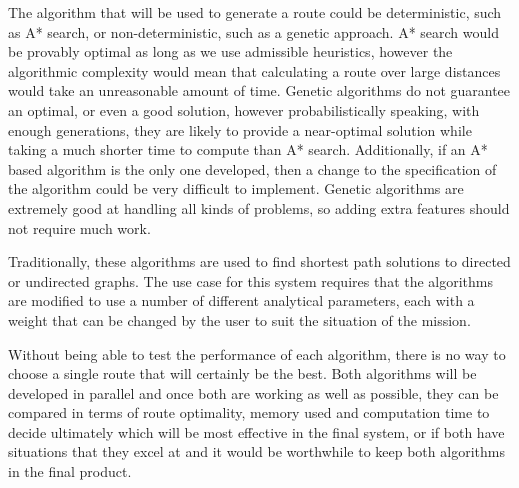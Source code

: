 \documentclass[12pt,a4paper]{article}
\begin{document}
  \par The algorithm that will be used to generate a route could be deterministic, such as A* search, or non-deterministic, such as a genetic approach. A* search would be provably optimal as long as we use admissible heuristics, \cite{hart1968formal} however the algorithmic complexity would mean that calculating a route over large distances would take an unreasonable amount of time. Genetic algorithms do not guarantee an optimal, or even a good solution, however probabilistically speaking, with enough generations, they are likely to provide a near-optimal solution while taking a much shorter time to compute than A* search. Additionally, if an A* based algorithm is the only one developed, then a change to the specification of the algorithm could be very difficult to implement. Genetic algorithms are extremely good at handling all kinds of problems, so adding extra features should not require much work.
  \par Traditionally, these algorithms are used to find shortest path solutions to directed or undirected graphs. The use case for this system requires that the algorithms are modified to use a number of different analytical parameters, each with a weight that can be changed by the user to suit the situation of the mission.
  \par Without being able to test the performance of each algorithm, there is no way to choose a single route that will certainly be the best. Both algorithms will be developed in parallel and once both are working as well as possible, they can be compared in terms of route optimality, memory used and computation time to decide ultimately which will be most effective in the final system, or if both have situations that they excel at and it would be worthwhile to keep both algorithms in the final product.
\end{document}
